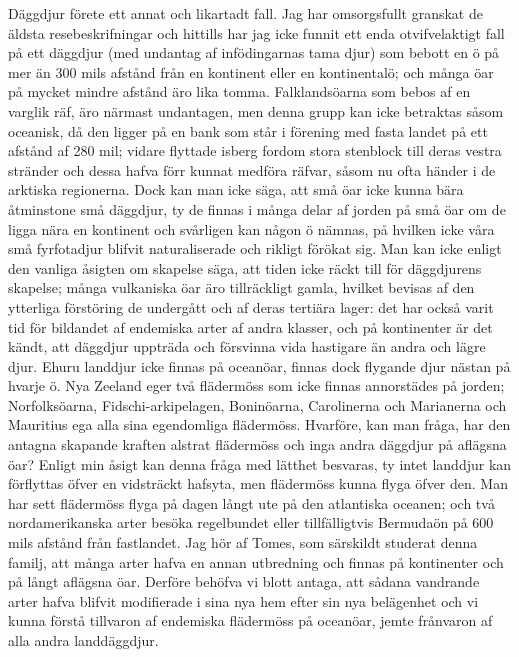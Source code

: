 Däggdjur förete ett annat och likartadt fall. Jag har omsorgsfullt granskat de äldsta resebeskrifningar och hittills har jag icke funnit ett enda otvifvelaktigt fall på ett däggdjur (med undantag af infödingarnas tama djur) som bebott en ö på mer än 300 mils afstånd från en kontinent eller en kontinentalö; och många öar på mycket mindre afstånd äro lika tomma. Falklandsöarna som bebos af en varglik räf, äro närmast undantagen, men denna grupp kan icke betraktas såsom oceanisk, då den ligger på en bank som står i förening med fasta landet på ett afstånd af 280 mil; vidare flyttade isberg fordom stora stenblock till deras vestra stränder och dessa hafva förr kunnat medföra räfvar, såsom nu ofta händer i de arktiska regionerna. Dock kan man icke säga, att små öar icke kunna bära åtminstone små däggdjur, ty de finnas i många delar af jorden på små öar om de ligga nära en kontinent och svårligen kan någon ö nämnas, på hvilken icke våra små fyrfotadjur blifvit naturaliserade och rikligt förökat sig. Man kan icke enligt den vanliga åsigten om skapelse säga, att tiden icke räckt till för däggdjurens skapelse; många vulkaniska öar äro tillräckligt gamla, hvilket bevisas af den ytterliga förstöring de undergått och af deras tertiära lager: det har också varit tid för bildandet af endemiska arter af andra klasser, och på kontinenter är det kändt, att däggdjur uppträda och försvinna vida hastigare än andra och lägre djur. Ehuru landdjur icke finnas på oceanöar, finnas dock flygande djur nästan på hvarje ö. Nya Zeeland eger två flädermöss som icke finnas annorstädes på jorden; Norfolksöarna, Fidschi-arkipelagen, Boninöarna, Carolinerna och Marianerna och Mauritius ega alla sina egendomliga flädermöss. Hvarföre, kan man fråga, har den antagna skapande kraften alstrat flädermöss och inga andra däggdjur på aflägsna öar? Enligt min åsigt kan denna fråga med lätthet besvaras, ty intet landdjur kan förflyttas öfver en vidsträckt hafsyta, men flädermöss kunna flyga öfver den. Man har sett flädermöss flyga på dagen långt ute på den atlantiska oceanen; och två nordamerikanska arter besöka regelbundet eller tillfälligtvis Bermudaön på 600 mils afstånd från fastlandet. Jag hör af Tomes, som särskildt studerat denna familj, att många arter hafva en annan utbredning och finnas på kontinenter och på långt aflägsna öar. Derföre behöfva vi blott antaga, att sådana vandrande arter hafva blifvit modifierade i sina nya hem efter sin nya belägenhet och vi kunna förstå tillvaron af endemiska flädermöss på oceanöar, jemte frånvaron af alla andra landdäggdjur.

